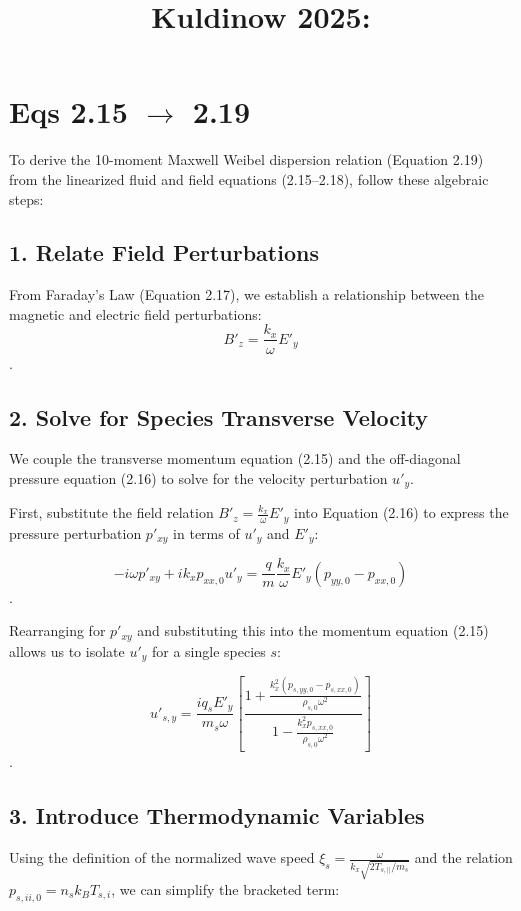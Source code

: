 \documentclass{wsconf}
\title{Kuldinow 2025: }
\begin{document}
\maketitle

\section{Eqs 2.15 $\rightarrow$ 2.19}

To derive the 10-moment Maxwell Weibel dispersion relation (Equation 2.19) from the linearized fluid and field equations (2.15–2.18), follow these algebraic steps:

\subsection{1. Relate Field Perturbations}
From Faraday’s Law (Equation 2.17), we establish a relationship between the magnetic and electric field perturbations:
$$B'_z = \frac{k_x}{\omega} E'_y$$.

\subsection{2. Solve for Species Transverse Velocity}

We couple the transverse momentum equation (2.15) and the off-diagonal pressure equation (2.16) to solve for the velocity perturbation $u'_y$. 

First, substitute the field relation $B'_z = \frac{k_x}{\omega} E'_y$ into Equation (2.16) to express the pressure perturbation $p'_{xy}$ in terms of $u'_y$ and $E'_y$:

$$-i\omega p'_{xy} + ik_x p_{xx,0} u'_y = \frac{q}{m} \frac{k_x}{\omega} E'_y (p_{yy,0} - p_{xx,0})$$.

Rearranging for $p'_{xy}$ and substituting this into the momentum equation (2.15) allows us to isolate $u'_y$ for a single species $s$:

$$u'_{s,y} = \frac{i q_s E'_y}{m_s \omega} \left[ \frac{1 + \frac{k_x^2 (p_{s,yy,0} - p_{s,xx,0})}{\rho_{s,0} \omega^2}}{1 - \frac{k_x^2 p_{s,xx,0}}{\rho_{s,0} \omega^2}} \right]$$.

\subsection{3. Introduce Thermodynamic Variables}

Using the definition of the normalized wave speed $\xi_s = \frac{\omega}{k_x \sqrt{2T_{s,||}/m_s}}$ and the relation $p_{s,ii,0} = n_s k_B T_{s,i}$, we can simplify the bracketed term:
\end{document}
